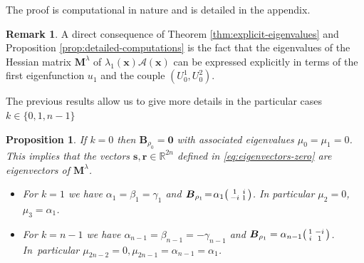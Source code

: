 \documentclass[JEP,XML,SOM,Unicode,ThmDefs,NoFloatCountersInSection,published]{cedram}
\newenvironment{smallpmatrix}{\big(\begin{smallmatrix}}{\end{smallmatrix}\big)}
\theoremstyle{plain}
\newtheorem{propo}[thm]{Proposition}
\theoremstyle{definition}
\newtheorem{rem}[thm]{Remark}
\newcommand{\bo}[1]{{\boldsymbol#1}}
\let\Bbb\mathbb
\begin{document}
The proof is computational in nature and is detailed in the appendix.

\begin{rem}
A direct consequence of Theorem \ref{thm:explicit-eigenvalues} and Proposition \ref{prop:detailed-computations} is the fact that the eigenvalues of the Hessian matrix $\bo M^\lambda$ of $\lambda_1(\bo x)\mathcal A(\bo x)$ can be expressed explicitly in terms of the first eigenfunction $u_1$ and the couple $(U_0^1,U_0^2)$.
\end{rem}

The previous results allow us to give more details in the particular cases $k\in \{0,1,n-1\}$
\begin{propo}
If $k=0$ then $\bo B_{\rho_0}= \bo 0$ with associated eigenvalues $\mu_0=\mu_1=0$. This implies that the vectors $\bo s, \bo r \in \Bbb{R}^{2n}$ defined in \eqref{eq:eigenvectors-zero} are eigenvectors of $\bo M^\lambda$.
\begin{itemize}
\item
For $k\!=\!1$ we have $\alpha_1\!=\!\beta_1\!=\!\gamma_1$ and $\bo B_{\rho_1} \!=\! \alpha_1 \begin{smallpmatrix} 1& i \\ -i & 1\end{smallpmatrix}$. In particular $\mu_{2} \!=\! 0$, $\mu_{3} \!=\! \alpha_1$.

\item
For $k=n-1$ we have $\alpha_{n-1}=\beta_{n-1}=-\gamma_{n-1}$ and $\bo B_{\rho_1} = \alpha_{n-1} \begin{smallpmatrix} 1& -i \\ i & 1\end{smallpmatrix}$. In~particular $\mu_{2n-2} = 0, \mu_{2n-1} = \alpha_{n-1}=\alpha_1$.
\end{itemize}
\label{prop:k=0,1}
\end{propo}
\end{document}
